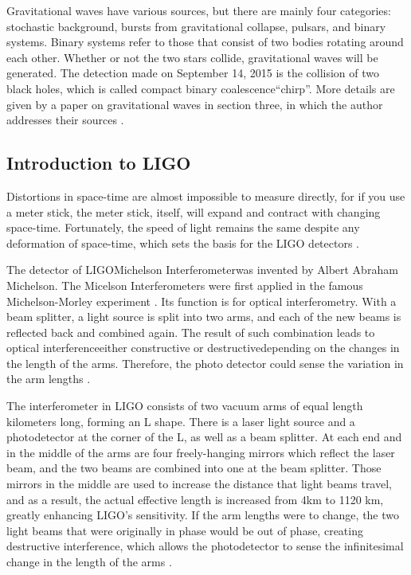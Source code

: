 \documentclass[aps,prd,preprint]{revtex4}
\begin{document}
\par Gravitational waves have various sources, but there are mainly four categories: stochastic background, bursts from gravitational collapse, pulsars, and binary systems. Binary systems refer to those that consist of two bodies rotating around each other. Whether or not the two stars collide, gravitational waves will be generated. The detection made on September 14, 2015 is the collision of two black holes, which is called compact binary coalescence\textemdash \enquote{chirp}. \cite{O1} More details are given by a paper on gravitational waves in section three, in which the author addresses their sources \cite{SBackground}.

\subsection{Introduction to LIGO \label{sec:LIGO}}
Distortions in space-time are almost impossible to measure directly, for if you use a meter stick, the meter stick, itself, will expand and contract with changing space-time. Fortunately, the speed of light remains the same despite any deformation of space-time, which sets the basis for the LIGO detectors \cite{CaltechLIGO}.
\par The detector of LIGO\textemdash Michelson Interferometer\textemdash was invented by Albert Abraham Michelson. The Micelson Interferometers were first applied in the famous Michelson-Morley experiment \cite{Michelson-Morley}. Its function is for optical interferometry. With a beam splitter, a light source is split into two arms, and each of the new beams is reflected back and combined again. The result of such combination leads to optical interference\textemdash either constructive or destructive\textendash depending on the changes in the length of the arms. Therefore, the photo detector could sense the variation in the arm lengths \cite{CaltechLIGO}.
\par The interferometer in LIGO consists of two vacuum arms of equal length kilometers long, forming an L shape. There is a laser light source and a photodetector at the corner of the L, as well as a beam splitter. At each end and in the middle of the arms are four freely-hanging mirrors which reflect the laser beam, and the two beams are combined into one at the beam splitter. Those mirrors in the middle are used to increase the distance that light beams travel, and as a result, the actual effective length is increased from 4km to 1120 km, greatly enhancing LIGO's sensitivity. If the arm lengths were to change, the two light beams that were originally in phase would be out of phase, creating destructive interference, which allows the photodetector to sense the infinitesimal change in the length of the arms \cite{CaltechLIGO, MitLIGO}.
\end{document}
